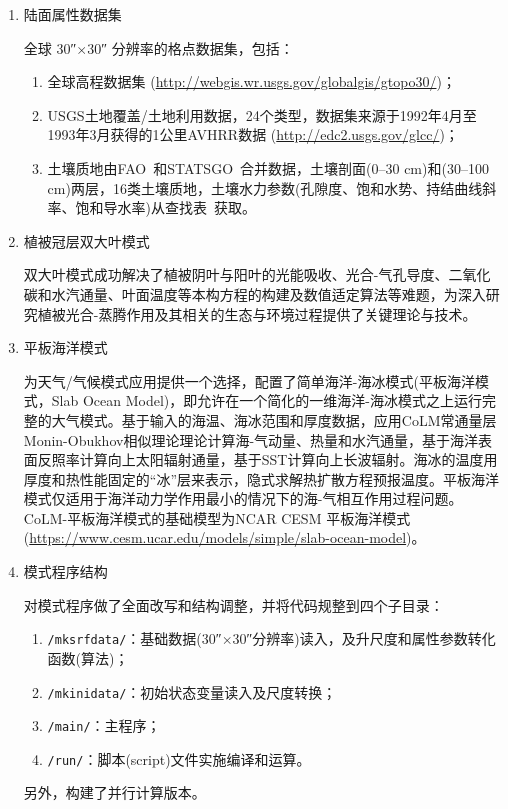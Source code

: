 \begin{enumerate}[label={\arabic*)}]
    \item 陆面属性数据集

    全球 \ang{;;30}$\times$\ang{;;30} 分辨率的格点数据集，包括：
    \begin{enumerate}[label={\alph*)}]
        \item 全球高程数据集 (\url{http://webgis.wr.usgs.gov/globalgis/gtopo30/})；
        \item USGS土地覆盖/土地利用数据，24个类型，数据集来源于1992年4月至1993年3月获得的1公里AVHRR数据 (\url{http://edc2.usgs.gov/glcc/})；
        \item 土壤质地由FAO~\citep{GlobalSoilData2000}和STATSGO~\citep{Miller1998conterminous}合并数据，土壤剖面(0--30 cm)和(30--100 cm)两层，16类土壤质地，土壤水力参数(孔隙度、饱和水势、持结曲线斜率、饱和导水率)从查找表~\citep{cosby1984statistical}获取。
    \end{enumerate}
    
    \item 植被冠层双大叶模式~\citep{dai2004two}
    
    双大叶模式成功解决了植被阴叶与阳叶的光能吸收、光合-气孔导度、二氧化碳和水汽通量、叶面温度等本构方程的构建及数值适定算法等难题，为深入研究植被光合-蒸腾作用及其相关的生态与环境过程提供了关键理论与技术。
    
    \item 平板海洋模式

    为天气/气候模式应用提供一个选择，配置了简单海洋-海冰模式(平板海洋模式，Slab Ocean Model)，即允许在一个简化的一维海洋-海冰模式之上运行完整的大气模式。基于输入的海温、海冰范围和厚度数据，应用CoLM常通量层Monin-Obukhov相似理论理论计算海-气动量、热量和水汽通量，基于海洋表面反照率计算向上太阳辐射通量，基于SST计算向上长波辐射。海冰的温度用厚度和热性能固定的“冰”层来表示，隐式求解热扩散方程预报温度。平板海洋模式仅适用于海洋动力学作用最小的情况下的海-气相互作用过程问题。CoLM-平板海洋模式的基础模型为NCAR CESM 平板海洋模式 (\url{https://www.cesm.ucar.edu/models/simple/slab-ocean-model})。
    
    \item 模式程序结构

    对模式程序做了全面改写和结构调整，并将代码规整到四个子目录：
    \begin{enumerate}[label={\alph*)}]
        \item \texttt{/mksrfdata/}：基础数据(\ang{;;30}$\times$\ang{;;30}分辨率)读入，及升尺度和属性参数转化函数(算法)；
        \item \texttt{/mkinidata/}：初始状态变量读入及尺度转换；
        \item \texttt{/main/}：主程序；
        \item \texttt{/run/}：脚本(script)文件实施编译和运算。
    \end{enumerate}
    另外，构建了并行计算版本。
\end{enumerate}


